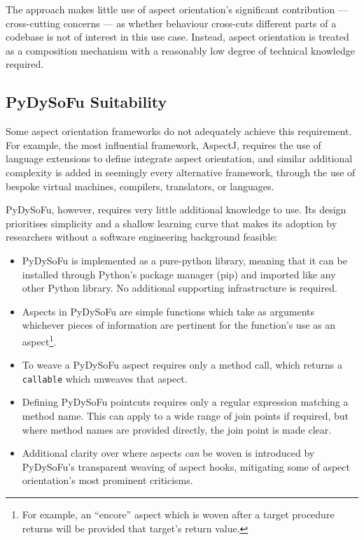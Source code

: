 The approach makes little use of aspect orientation's significant contribution
--- cross-cutting concerns --- as whether behaviour cross-cuts different parts
of a codebase is not of interest in this use case. Instead, aspect orientation
is treated as a composition mechanism with a reasonably low degree of technical
knowledge required.

\subsection{PyDySoFu Suitability}\label{subsec:optimisation_with_aspects_usingpdsf}
Some aspect orientation frameworks do not adequately achieve this requirement.
For example, the most influential framework, AspectJ, requires the use of
language extensions to define integrate aspect
orientation\cite{AspectJLanguageAndTools}, and similar additional complexity is
added in seemingly every alternative framework, through the use of bespoke
virtual machines, compilers, translators, or
languages\cite{rajan2006nu_towardsAO_invocation,popovici2003JITaspects,AspectCplusplusDesignImpl,baker2002maya}.

PyDySoFu, however, requires very little additional knowledge to use. Its design
prioritises simplicity and a shallow learning curve that makes its adoption by
researchers without a software engineering background feasible: 

\begin{itemize}
    \item PyDySoFu is implemented as a pure-python library, meaning that it can
    be installed through Python's package manager (pip) and imported like any
    other Python library. No additional supporting infrastructure is required.
    \item Aspects in PyDySoFu are simple functions which take as arguments
    whichever pieces of information are pertinent for the function's use as an
    aspect\footnote{For example, an ``encore'' aspect which is woven after a
    target procedure returns will be provided that target's return value.}.
    \item To weave a PyDySoFu aspect requires only a method call, which returns a
    \lstinline{callable} which unweaves that aspect.
    \item Defining PyDySoFu pointcuts requires only a regular expression
    matching a method name. This can apply to a wide range of join points if
    required, but where method names are provided directly, the join point is
    made clear.
    \item Additional clarity over where aspects \emph{can} be woven is
    introduced by PyDySoFu's transparent weaving of aspect hooks, mitigating
    some of aspect orientation's most prominent criticisms.
\end{itemize}

